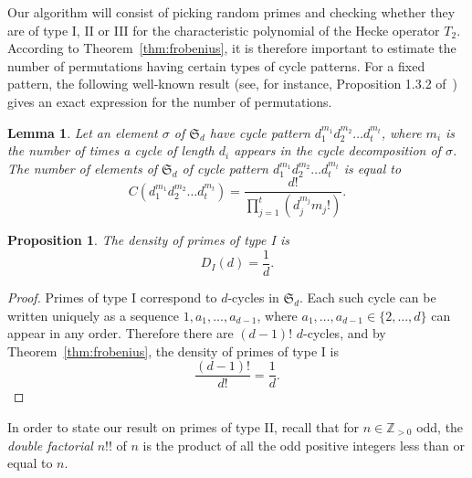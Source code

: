 \documentclass[11pt]{article}
\theoremstyle{plain}
\newtheorem{lemma}[theorem]{Lemma}
\newtheorem{proposition}[theorem]{Proposition}
\theoremstyle{definition}
\theoremstyle{remark}
\numberwithin{equation}{section}
\newcommand{\ZZ}{\mathbb{Z}}
\renewcommand{\SS}{\mathfrak{S}}
\begin{document}
Our algorithm will consist of picking random primes and checking whether they
are of type I, II or III for the characteristic polynomial of the Hecke
operator $T_2$.  According to Theorem~\ref{thm:frobenius}, 
it is therefore important to estimate the number of permutations having
certain types of cycle patterns.  For a fixed pattern, the following
well-known result 
(see, for instance, Proposition 1.3.2 of~\cite{Stanley1}) gives an exact
expression for the number of permutations.

\begin{lemma}\label{lem:cycletype}
  Let an element $\sigma$ of $\SS_d$ have cycle pattern $d_1^{m_1}d_2^{m_2}\ldots d_t^{m_t}$, 
  where $m_i$ is the number of times a cycle of length $d_i$ appears in the cycle
  decomposition of $\sigma$. 
  The number
   of elements of $\SS_d$ of cycle pattern $d_1^{m_1}d_2^{m_2}\ldots d_t^{m_t}$ is equal to
  \begin{equation*}
    C(d_1^{m_1}d_2^{m_2}\ldots d_t^{m_t})=\frac{d!}{\prod_{j=1}^t\left(d_j^{m_j}m_j!\right)}.
  \end{equation*}
\end{lemma}


\begin{proposition}\label{prop:type1}
  The density of primes of type I is 
  \begin{equation*}
    D_I(d)=\frac{1}{d}.
  \end{equation*}
\end{proposition}
\begin{proof}
  Primes of type I correspond to $d$-cycles in $\SS_d$.  Each such cycle can
  be written uniquely as a sequence $1,a_1,\ldots,a_{d-1}$, where
  $a_1,\ldots,a_{d-1}\in\{2,\ldots,d\}$ can appear in any order.  Therefore
  there are $(d-1)!$ $d$-cycles, and by Theorem~\ref{thm:frobenius},
  the density of primes of type I is
  \begin{equation*}
    \frac{(d-1)!}{d!}=\frac{1}{d}.
  \end{equation*}
\end{proof}

In order to state our result on primes of type II, recall that
for $n\in\ZZ_{>0}$ odd, the \emph{double factorial} $n!!$ of $n$ is
the product of all the odd positive integers less than or equal to $n$.
\end{document}
